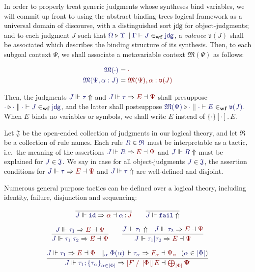 \documentclass[11pt]{article}
\theoremstyle{definition}
\theoremstyle{remark}
\numberwithin{equation}{section}
\def\IModeColorName{MidnightBlue}
\def\OModeColorName{Maroon}
\newcommand\IMode[1]{{\color{\IModeColorName}{#1}}}
\newcommand\OMode[1]{{\color{\OModeColorName}{#1}}}
\newcommand\HypJ[2]{#1\ \ (#2)}
\newcommand\GenJ[2]{\vert_{\IMode{#1}}\; #2}
\newcommand\JJ{J}
\newcommand\RSet{\mathfrak{R}}
\newcommand\JSet{\mathfrak{J}}
\newcommand\IsTac[1]{\IMode{#1}\ \textit{tactic}}
\newcommand\MkSet[1]{\left\{#1\right\}}
\newcommand\MkFam[3]{\MkSet{#1_{#2}}_{#2\in #3}}
\newcommand\IsWf[5]{%
  \IMode{#1}\triangleright%
  \IMode{#2}\parallel%
  \IMode{#3}\vdash%
  \IMode{#4}\in_{\mathbf{wf}}\IMode{#5}%
}
\newcommand\SortJdg{\mathsf{jdg}}
\newcommand\MkBTm[3]{\{#1\}[#2].\, #3}
\newcommand\JdgValence[1]{\mathfrak{v}(#1)}
\newcommand\Metavars[1]{\mathfrak{M}(#1)}
\newcommand\OSG[2]{\IMode{#1}\,{\color{Black}:}\,\OMode{#2}}
\newcommand\Refine[4]{\IMode{#1}\Vdash\IMode{#2}\Rightarrow\OMode{#4}\dashv\OMode{#3}}
\newcommand\NoRefine[2]{\IMode{#1}\Vdash\IMode{#2}\Uparrow}
\newcommand\Member[2]{\IMode{#1}\in\IMode{#2}}
\newcommand\IdTac{\mathtt{id}}
\newcommand\FailTac{\mathtt{fail}}
\newcommand\OrElseTac[2]{#1\vert#2}
\newcommand\ThenTac[2]{#1;#2}
\newcommand\Dom[1]{\left\vert#1\right\vert}
\newcommand\Subst[3]{\left[#1\;/\;#2\right]#3}
\begin{document}
In order to properly treat generic judgments whose syntheses bind variables, we
will commit up front to using the abstract binding trees logical framework as a
universal domain of discourse, with a distinguished sort $\SortJdg$ for
object-judgments; and to each judgment $\JJ$ such that
$\IsWf{\Omega}{\Upsilon}{\Gamma}{\JJ}{\SortJdg}$, a \emph{valence}
$\JdgValence{\JJ}$ shall be associated which describes the binding structure of
its synthesis. Then, to each subgoal context $\Psi$, we shall associate a
metavariable context $\Metavars{\Psi}$ as follows:

\begin{align*}
  \IMode{\Metavars{\cdot}} &= \OMode{\cdot}\\
  \IMode{\Metavars{\Psi, \alpha:\JJ}} &= \OMode{\Metavars{\Psi}, \alpha : \JdgValence{\JJ}}
\end{align*}

Then, the judgments $\NoRefine{\JJ}{\tau}$ and $\Refine{\JJ}{\tau}{\Psi}{E}$
shall presuppose $\IsWf{\cdot}{\cdot}{\cdot}{\JJ}{\SortJdg}$, and the latter
shall postsuppose $\IsWf{\Metavars{\Psi}}{\cdot}{\cdot}{E}{\JdgValence{\JJ}}$.
When $E$ binds no variables or symbols, we shall write $E$ instead of
$\MkBTm{\cdot}{\cdot}{E}$.



Let $\JSet$ be the open-ended collection of judgments in our logical theory,
and let $\RSet$ be a collection of rule names. Each rule $\Member{R}{\RSet}$
must be interpretable as a tactic, i.e.\ the meaning of the assertions
$\Refine{\JJ}{R}{\Psi}{E}$ and $\NoRefine{\JJ}{R}$ must be explained for
$\Member{J}{\JSet}$. We say \framebox{$\IsTac{\tau}$} in case for all
object-judgments $\Member{\JJ}{\JSet}$, the assertion conditions for
$\Refine{\JJ}{\tau}{\Psi}{E}$ and $\NoRefine{\JJ}{\tau}$ are well-defined and
disjoint.

Numerous general purpose tactics can be defined over a logical theory,
including identity, failure, disjunction and sequencing:

\begin{gather*}
  \infer{
    \Refine{\JJ}{\IdTac}{\OSG{\alpha}{\JJ}}{\alpha}
  }{
  }
  \qquad
  \infer{
    \NoRefine{\JJ}{\FailTac}
  }{
  }\\[6pt]
  \infer{
    \Refine{\JJ}{\OrElseTac{\tau_1}{\tau_2}}{\Psi}{E}
  }{
    \Refine{\JJ}{\tau_1}{\Psi}{E}
  }
  \qquad
  \infer{
    \Refine{\JJ}{\OrElseTac{\tau_1}{\tau_2}}{\Psi}{E}
  }{
    \NoRefine{\JJ}{\tau_1} &
    \Refine{\JJ}{\tau_2}{\Psi}{E}
  }\\[6pt]
  \infer{
    \Refine{\JJ}{\ThenTac{\tau_1}{\MkFam{\tau}{\alpha}{\Dom\Phi}}}{\bigoplus_{\Dom\Phi}\mathbf\Psi}{\Subst{F}{\Dom\Phi}{E}}
  }{
    \Refine{\JJ}{\tau_1}{\Phi}{E} &
    \GenJ{\alpha}{
      \HypJ{
        \Refine{\Phi(\alpha)}{\tau_\alpha}{\Psi_\alpha}{F_\alpha}
      }{
        \Member{\alpha}{\Dom\Phi}
      }
    }
  }
\end{gather*}
\end{document}
